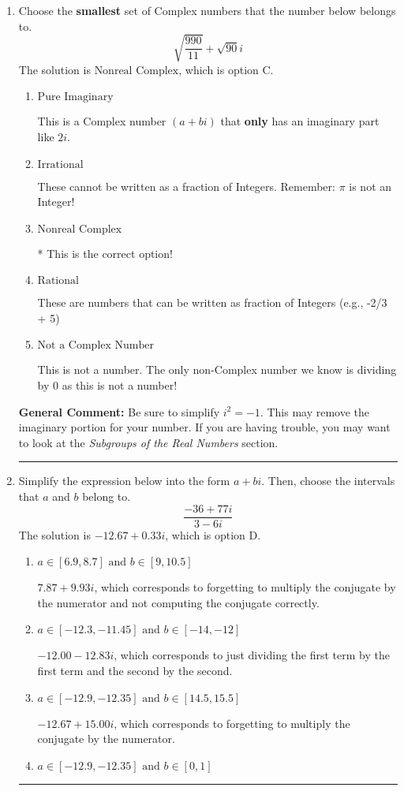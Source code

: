\documentclass{extbook}[14pt]
\newcommand{\litem}[1]{\item #1

\rule{\textwidth}{0.4pt}}
\begin{document}
\begin{enumerate}\litem{
Choose the \textbf{smallest} set of Complex numbers that the number below belongs to.
\[ \sqrt{\frac{990}{11}}+\sqrt{90} i \]
The solution is \( \text{Nonreal Complex} \), which is option C.\begin{enumerate}[label=\Alph*.]
\item \( \text{Pure Imaginary} \)

This is a Complex number $(a+bi)$ that \textbf{only} has an imaginary part like $2i$.
\item \( \text{Irrational} \)

These cannot be written as a fraction of Integers. Remember: $\pi$ is not an Integer!
\item \( \text{Nonreal Complex} \)

* This is the correct option!
\item \( \text{Rational} \)

These are numbers that can be written as fraction of Integers (e.g., -2/3 + 5)
\item \( \text{Not a Complex Number} \)

This is not a number. The only non-Complex number we know is dividing by 0 as this is not a number!
\end{enumerate}

\textbf{General Comment:} Be sure to simplify $i^2 = -1$. This may remove the imaginary portion for your number. If you are having trouble, you may want to look at the \textit{Subgroups of the Real Numbers} section.
}
\litem{
Simplify the expression below into the form $a+bi$. Then, choose the intervals that $a$ and $b$ belong to.
\[ \frac{-36 + 77 i}{3 - 6 i} \]
The solution is \( -12.67  + 0.33 i \), which is option D.\begin{enumerate}[label=\Alph*.]
\item \( a \in [6.9, 8.7] \text{ and } b \in [9, 10.5] \)

 $7.87  + 9.93 i$, which corresponds to forgetting to multiply the conjugate by the numerator and not computing the conjugate correctly.
\item \( a \in [-12.3, -11.45] \text{ and } b \in [-14, -12] \)

 $-12.00  - 12.83 i$, which corresponds to just dividing the first term by the first term and the second by the second.
\item \( a \in [-12.9, -12.35] \text{ and } b \in [14.5, 15.5] \)

 $-12.67  + 15.00 i$, which corresponds to forgetting to multiply the conjugate by the numerator.
\item \( a \in [-12.9, -12.35] \text{ and } b \in [0, 1] \)


\end{enumerate}}
\end{enumerate}
\end{document}
